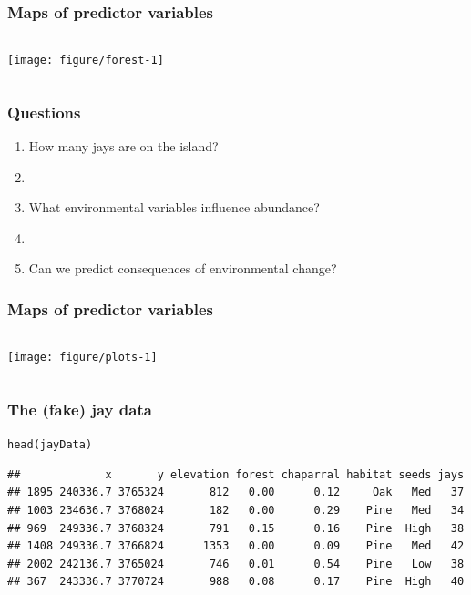 \documentclass[color=usenames,dvipsnames]{beamer}\usepackage[]{graphicx}\usepackage[]{color}
\makeatletter
\newcommand{\hlstd}[1]{\textcolor[rgb]{0,0,0}{#1}}%
\newcommand{\hlkwd}[1]{\textcolor[rgb]{0.004,0.004,0.506}{#1}}%
\newenvironment{kframe}{%
 \def\at@end@of@kframe{}%
 \ifinner\ifhmode%
  \def\at@end@of@kframe{\end{minipage}}%
  \begin{minipage}{\columnwidth}%
 \fi\fi%
 \def\FrameCommand##1{\hskip\@totalleftmargin \hskip-\fboxsep
 \colorbox{shadecolor}{##1}\hskip-\fboxsep
     \hskip-\linewidth \hskip-\@totalleftmargin \hskip\columnwidth}%
 \MakeFramed {\advance\hsize-\width
   \@totalleftmargin\z@ \linewidth\hsize
   \@setminipage}}%
 {\par\unskip\endMakeFramed%
 \at@end@of@kframe}
\newenvironment{knitrout}{}{} %
\makeatother
\begin{document}
\begin{frame}[fragile]
  \frametitle{Maps of predictor variables}
  \scriptsize

\begin{columns}
  \column{\dimexpr\paperwidth-10pt}
  \texttt{[image: figure/forest-1]}
\end{columns}
\end{frame}






\begin{frame}
  \frametitle{Questions}
  \large
  \begin{enumerate}
    \item How many jays are on the island?
    \item[]
    \item What environmental variables influence abundance?
    \item[]
    \item Can we predict consequences of environmental change?
  \end{enumerate}
\end{frame}



\begin{frame}[fragile]
  \frametitle{Maps of predictor variables}

\begin{columns}
  \column{\dimexpr\paperwidth-10pt}
  \texttt{[image: figure/plots-1]}
\end{columns}
\end{frame}




\begin{frame}[fragile]
  \frametitle{The (fake) jay data}
\begin{knitrout}\scriptsize
{}\color{fgcolor}\begin{kframe}
\begin{alltt}
\hlkwd{head}\hlstd{(jayData)}
\end{alltt}
\begin{verbatim}
##             x       y elevation forest chaparral habitat seeds jays
## 1895 240336.7 3765324       812   0.00      0.12     Oak   Med   37
## 1003 234636.7 3768024       182   0.00      0.29    Pine   Med   34
## 969  249336.7 3768324       791   0.15      0.16    Pine  High   38
## 1408 249336.7 3766824      1353   0.00      0.09    Pine   Med   42
## 2002 242136.7 3765024       746   0.01      0.54    Pine   Low   38
## 367  243336.7 3770724       988   0.08      0.17    Pine  High   40
\end{verbatim}
\end{kframe}
\end{knitrout}
\end{frame}
\end{document}
